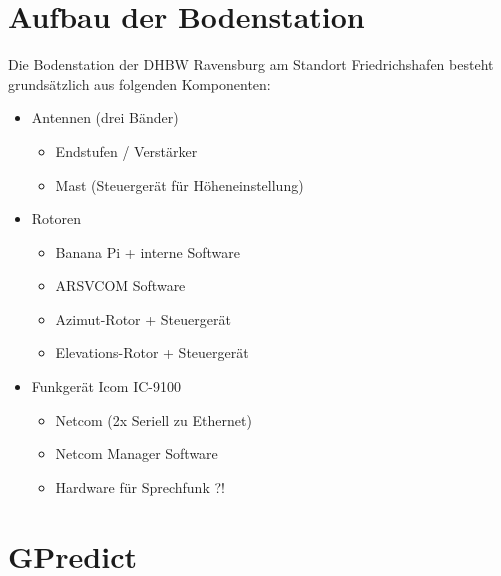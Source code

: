 
\chapter{Aufbau der Bodenstation}

Die Bodenstation der DHBW Ravensburg am Standort Friedrichshafen besteht grundsätzlich aus folgenden Komponenten:

\begin{itemize}
	\parskip0pt
	\item Antennen (drei Bänder)
	\begin{itemize}
		\item Endstufen / Verstärker
		\item Mast (Steuergerät für Höheneinstellung)
	\end{itemize}
	\item Rotoren
	\begin{itemize}
		\item Banana Pi + interne Software
		\item ARSVCOM Software
		\item Azimut-Rotor + Steuergerät
		\item Elevations-Rotor + Steuergerät
	\end{itemize}
	\item Funkgerät Icom IC-9100
	\begin{itemize}
		\item Netcom (2x Seriell zu Ethernet)
		\item Netcom Manager Software
		\item Hardware für Sprechfunk ?!
	\end{itemize}
\end{itemize}


\chapter{GPredict}

